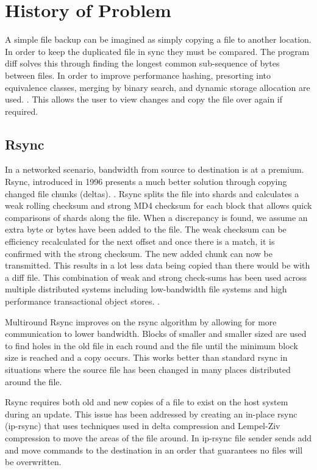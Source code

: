 \documentclass[11pt, a4paper, twocolumn, twoside]{report}
\begin{document}
\section{History of Problem}

A simple file backup can be imagined as simply copying a file to another location. In order to keep the duplicated file in sync they must be compared. The program diff solves this through finding the longest common sub-sequence of bytes between files. In order to improve performance hashing, presorting into equivalence classes, merging by binary search, and dynamic storage allocation are used. \citep{hunt1976algorithm}. This allows the user to view changes and copy the file over again if required.

\subsection{Rsync}
In a networked scenario, bandwidth from source to destination is at a premium. Rsync, introduced in 1996 presents a much better solution through copying changed file chunks (deltas). \citep{tridgell1996rsync}. Rsync splits the file into shards and calculates a weak rolling checksum and strong MD4 checksum for each block that allows quick comparisons of shards along the file. When a discrepancy is found, we assume an extra byte or bytes have been added to the file. The weak checksum can be efficiency recalculated for the next offset and once there is a match, it is confirmed with the strong checksum. The new added chunk can now be transmitted. This results in a lot less data being copied than there would be with a diff file. \citep{tridgell1996rsync} This combination of weak and strong check-sums has been used across multiple distributed systems including low-bandwidth file systems \citep{muthitacharoen2001low} and high performance transactional object stores. \citep{stephen2000platypus}.

Multiround Rsync improves on the rsync algorithm by allowing for more communication to lower bandwidth. Blocks of smaller and smaller sized are used to find holes in the old file in each round and the file until the minimum block size is reached and a copy occurs. \citep{multiroundrsync} This works better than standard rsync in situations where the source file has been changed in many places distributed around the file.

Rsync requires both old and new copies of a file to exist on the host system during an update. This issue has been addressed by creating an in-place rsync (ip-rsync) that uses techniques used in delta compression and Lempel-Ziv compression to move the areas of the file around. In ip-rsync file sender sends add and move commands to the destination in an order that guarantees no files will be overwritten. \citep{rasch2003place}
\end{document}
